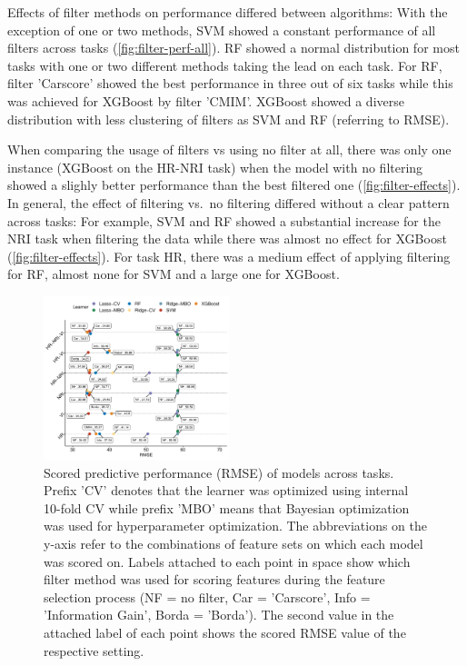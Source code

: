 \documentclass[letterpaper, peerreview]{IEEEtran}
\begin{document}
Effects of filter methods on performance differed between algorithms:
With the exception of one or two methods, SVM showed a constant performance of all filters across tasks (\autoref{fig:filter-perf-all}).
RF showed a normal distribution for most tasks with one or two different methods taking the lead on each task.
For RF, filter 'Carscore' showed the best performance in three out of six tasks while this was achieved for XGBoost by filter 'CMIM'.
XGBoost showed a diverse distribution with less clustering of filters as SVM and RF (referring to RMSE).

When comparing the usage of filters vs using no filter at all, there was only one instance (XGBoost on the HR-NRI task) when the model with no filtering showed a slighly better performance than the best filtered one (\autoref{fig:filter-effects}).
In general, the effect of filtering vs.\ no filtering differed without a clear pattern across tasks: For example, SVM and RF showed a substantial increase for the NRI task when filtering the data while there was almost no effect for XGBoost (\autoref{fig:filter-effects}).
For task HR, there was a medium effect of applying filtering for RF, almost none for SVM and a large one for XGBoost.





\begin{figure} [t!]
	\centering
	\begin{center}
		\includegraphics[width=0.48\textwidth] {performance-results-1.pdf}
		\caption{Scored predictive performance (RMSE) of models across tasks. Prefix 'CV' denotes that the learner was optimized using internal 10-fold CV while prefix 'MBO' means that Bayesian optimization was used for hyperparameter optimization. The abbreviations on the y-axis refer to the combinations of feature sets on which each model was scored on. Labels attached to each point in space show which filter method was used for scoring features during the feature selection process (NF = no filter, Car = 'Carscore', Info = 'Information Gain', Borda = 'Borda'). The second value in the attached label of each point shows the scored RMSE value of the respective setting.}\label{fig:perf-result}
	\end{center}
\end{figure}
\end{document}
